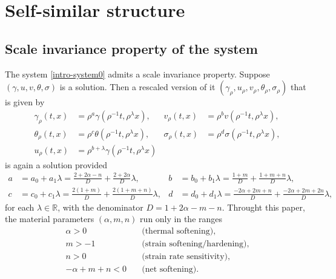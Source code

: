 \documentclass[a4paper,11pt]{article}
\theoremstyle{remark}
\begin{document}
\section{Self-similar structure} \label{sec:scale}

\subsection{Scale invariance property of the system}
The system \eqref{intro-system0} admits a scale invariance property. Suppose $(\gamma,u,v,\theta,\sigma)$ is a solution. Then a rescaled version of it $(\gamma_\rho,u_\rho,v_\rho,\theta_\rho,\sigma_\rho)$ that is given by
\begin{equation}\label{eq:scale}
\begin{aligned}
 \gamma_\rho(t,x) &= \rho^a\gamma(\rho^{-1}t,\rho^\lambda x), &
 v_\rho(t,x) &= \rho^bv(\rho^{-1}t,\rho^\lambda x),\\
 \theta_\rho(t,x) &= \rho^c\theta(\rho^{-1}t,\rho^\lambda x), &
 \sigma_\rho(t,x) &= \rho^d\sigma(\rho^{-1}t,\rho^\lambda x),\\
 u_\rho(t,x) &= \rho^{b+\lambda}\gamma(\rho^{-1}t,\rho^\lambda x)
\end{aligned}
\end{equation}
is again a solution provided
\begin{equation} \label{eq:exponents}
\begin{aligned}
 a&= a_0 + a_1 \lambda=\frac{2+2\alpha-n}{D} + \frac{2+2\alpha}{D}\lambda, & b&=b_0 + b_1\lambda=\frac{1+m}{D} + \frac{1+m+n}{D}\lambda ,\\
 c&=c_0 + c_1\lambda=\frac{2(1+m)}{D} + \frac{2(1+m+n)}{D}\lambda, & d&=d_0 + d_1\lambda=\frac{-2\alpha + 2m +n}{D} + \frac{-2\alpha+2m+2n}{D}\lambda,
\end{aligned}
\end{equation}
for each $\lambda \in \mathbb{R}$, with the denominator $D = 1+2\alpha-m-n$. Throught this paper, the material parameters $(\alpha,m,n)$ run only in the ranges%
\begin{equation}
 \begin{aligned}
  \alpha>0\quad&\text{(thermal softening)},\\
  m>-1 \quad&\text{(strain softening/hardening)}, \\%
  n>0 \quad&\text{(strain rate sensitivity)},\\ %
  -\alpha+m+n<0 \quad&\text{(net softening)}. \\%
\end{aligned}\label{eq:paramrange}
\end{equation}
\end{document}
